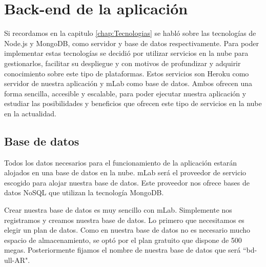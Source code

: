 %
%
%  
  
  
\chapter{Back-end de la aplicación} \label{chap:BackEnd} 

Si recordamos en la capitulo \ref{chap:Tecnologias} se habló sobre las tecnologías de Node.js y MongoDB, como servidor y base de datos respectivamente. Para poder implementar estas tecnologías se decidió por utilizar servicios en la nube para gestionarlos, facilitar su despliegue y con motivos de profundizar y adquirir conocimiento sobre este tipo de plataformas. Estos servicios son Heroku como servidor de nuestra aplicación y mLab como base de datos. Ambos ofrecen una forma sencilla, accesible y escalable, para poder ejecutar nuestra aplicación y estudiar las posibilidades y beneficios que ofrecen este tipo de servicios en la nube en la actualidad.

\section{Base de datos}

Todos los datos necesarios para el funcionamiento de la aplicación estarán alojados en una base de datos en la nube. mLab será el proveedor de servicio escogido para alojar nuestra base de datos. Este proveedor nos ofrece bases de datos NoSQL que utilizan la tecnología MongoDB.

Crear nuestra base de datos es muy sencillo con mLab. Simplemente nos registramos y creamos nuestra base de datos. Lo primero que necesitamos es elegir un plan de datos. Como en nuestra base de datos no es necesario mucho espacio de almacenamiento, se optó por el plan gratuito que dispone de 500 megas. Posteriormente fijamos el nombre de nuestra base de datos que será ``bd-ull-AR".


